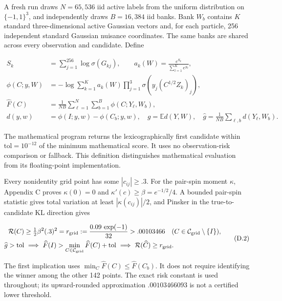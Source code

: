 \documentclass{article}
\begin{document}
A fresh run draws \(N=65,536\) iid active labels from the uniform
distribution on \(\{-1,1\}^3\), and independently draws \(B=16,384\) iid
banks. Bank \(W_b\) contains \(K\) standard three-dimensional active
Gaussian vectors and, for each particle, 256 independent standard
Gaussian nuisance coordinates. The same banks are shared across every
observation and candidate. Define

\[
\begin{aligned}
S_k&=\sum_{j=1}^{256}\log\sigma(G_{kj}),\qquad
a_k(W)=\frac{e^{S_k}}{\sum_{l=1}^{K}e^{S_l}},\\
\phi(C;y,W)&=-\log\sum_{k=1}^{K}a_k(W)
 \prod_{j=1}^{3}\sigma\!\left(y_j(C^{1/2}Z_k)_j\right),\\
\widehat F(C)&=\frac1{NB}\sum_{\ell=1}^{N}\sum_{b=1}^{B}\phi(C;Y_\ell,W_b),\\
d(y,w)&=\phi(I;y,w)-\phi(C_b;y,w),\quad
g=\mathbb E d(Y,W),\quad
\widehat g=\frac1{NB}\sum_{\ell,b}d(Y_\ell,W_b).
\end{aligned}
\tag{D.1}
\]

The mathematical program returns the lexicographically first candidate
within \(\mathrm{tol}=10^{-12}\) of the minimum mathematical score. It
uses no observation-risk comparison or fallback. This definition
distinguishes mathematical evaluation from its floating-point
implementation.

Every nonidentity grid point has some \(|c_{ij}|\ge.3\). For the
pair-spin moment \(\kappa\), Appendix C proves \(\kappa(0)=0\) and
\(\kappa'(c)\ge\beta=e^{-1/2}/4\). A bounded pair-spin statistic gives
total variation at least \(|\kappa(c_{ij})|/2\), and Pinsker in the
true-to-candidate KL direction gives

\[
\begin{aligned}
\mathcal R(C)&\ge\tfrac12\beta^2(.3)^2
=r_{\rm grid}:=\frac{0.09\,\exp(-1)}{32}>.00103466
 \quad(C\in\mathcal C_{\rm grid}\setminus\{I\}),\\
\widehat g>\mathrm{tol}
&\ \Longrightarrow\
\widehat F(I)>\min_{C\in\mathcal C_{\rm grid}}\widehat F(C)+\mathrm{tol}
\ \Longrightarrow\ \mathcal R(\widehat C)\ge r_{\rm grid}.
\end{aligned}
\tag{D.2}
\]

The first implication uses \(\min_C\widehat F(C)\le\widehat F(C_b)\). It
does not require identifying the winner among the other 142 points. The
exact risk constant is used throughout; its upward-rounded approximation
\(.00103466093\) is not a certified lower threshold.
\end{document}
